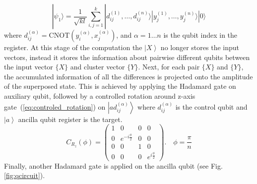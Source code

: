 \documentclass[pra,showkeys,twocolumn,showpacs]{revtex4-1}
\begin{document}
\begin{equation}
    | \psi_1 \rangle  =  
    \frac{1}{\sqrt{kl}} \sum_{i, j=1}^{k} 
    | d^{(1)}_{ij}, \dots, d^{(n)}_{ij} \rangle 
    | y^{(1)}_j, \dots, y^{(n)}_j \rangle
    | 0 \rangle 
\end{equation}
%
where $d^{(\alpha)}_{ij} = \mathrm{CNOT}(y^{(\alpha)}_i, x^{(\alpha)}_j)$, and $\alpha = 1 \dots n$  is the qubit index in the register. 
At this stage of the computation the $\left| X \right\rangle$ no longer stores the input vectors,
instead it stores the information about pairwise different qubits between the input vector $\{X\}$ and cluster vector $\{Y\}$. 
Next, for each pair $\{X\}$ and $\{Y\}$, the accumulated information of all the differences is projected onto the amplitude of the superposed state. 
This is achieved by applying the Hadamard gate on auxiliary qubit, 
followed by a controlled rotation around z-axis gate~(\ref{eq:controled_rotation}) on $\left|a d_{ij}^{(\alpha)}\right\rangle$ 
where $d_{ij}^{(\alpha)}$ is the control qubit and $\left| a \right\rangle$ ancilla qubit register is the target.
%
\begin{equation}
    \label{eq:controled_rotation}
    C_{R_z}(\phi) = 
    \begin{pmatrix}
        1 & 0 & 0 & 0 \\
        0 & e^{-i \frac \phi 2} & 0 & 0 \\
        0 & 0 & 1 & 0 \\
		0 & 0 & 0 & e^{i \frac \phi 2}
    \end{pmatrix} .
    \quad \phi = \frac{\pi}{n}
\end{equation}
%
Finally, another Hadamard gate is applied on the ancilla qubit (see Fig. \ref{fig:qcircuit}). 
\end{document}
